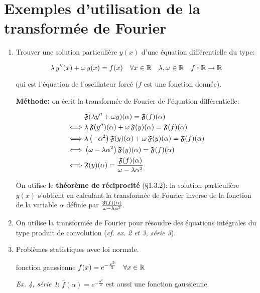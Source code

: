 \newpage
\section{Exemples d'utilisation de la transformée de Fourier}

\begin{enumerate}[label=\alph*)]
    \item
    Trouver une solution particulière $y(x)$ d'une équation différentielle du type:
    
    \[\lambda\, y''(x) + \omega\, y(x) = f(x) \quad \forall x \in \mathbb{R} \quad \lambda, \omega \in \mathbb{R} \quad f: \mathbb{R} \rightarrow \mathbb{R}\]
    
    qui est l'équation de l'oscillateur forcé ($f$ est une fonction donnée).
    
    \textbf{Méthode:} on écrit la transformée de Fourier de l'équation différentielle:
    
    \begin{align*}
    &\mathfrak{F}(\lambda y'' + \omega y)(\alpha) = \mathfrak{F}(f)(\alpha)
    \\\iff&
    \lambda \, \mathfrak{F}(y'')(\alpha) + \omega \, \mathfrak{F}(y)(\alpha) = \mathfrak{F}(f)(\alpha)
    \\\iff&
    \lambda \left(-\alpha^2\right) \mathfrak{F}(y)(\alpha) + \omega \, \mathfrak{F}(y)(\alpha) = \mathfrak{F}(f)(\alpha)
    \\\iff&
    \left(\omega - \lambda \alpha^2\right) \mathfrak{F}(y)(\alpha) = \mathfrak{F}(f)(\alpha)
    \\\iff&
    \mathfrak{F}(y)(\alpha) = \frac{\mathfrak{F}(f)(\alpha)}{\omega - \lambda \alpha^2}
    \end{align*}
    
    On utilise le \textbf{théorème de réciprocité} (§1.3.2): la solution particulière $y(x)$ s'obtient en calculant la transformée de Fourier inverse de la fonction de la variable $\alpha$ définie par $\frac{\mathfrak{F}(f)(\alpha)}{\omega - \lambda \alpha^2}$.
    
    
    \item
    On utilise la transformée de Fourier pour résoudre des équations intégrales du type produit de convolution (\textit{cf. ex. 2 et 3, série 3}).
    
    
    \item
    Problèmes statistiques avec loi normale.
    
    fonction gaussienne $f(x) = e^{-\frac{x^2}{2}} \quad \forall x\in \mathbb{R}$
    
    \textit{Ex. 4, série 1}: $\hat{f}(\alpha) = e^{-\frac{\alpha^2}{2}}$ est aussi une fonction gaussienne.
    

\end{enumerate}
